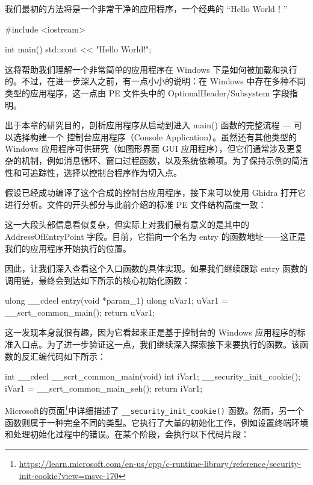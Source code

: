 
我们最初的方法将是一个非常干净的应用程序，一个经典的 “Hello World！”

\begin{cpp}
#include <iostream>

int main() {
  std::cout << "Hello World!\n";
}
\end{cpp}

这将帮助我们理解一个非常简单的应用程序在 Windows 下是如何被加载和执行的。不过，在进一步深入之前，有一点小小的说明：在 Windows 中存在多种不同类型的应用程序，这一点由 PE 文件头中的 OptionalHeader/Subsystem 字段指明。

出于本章的研究目的，剖析应用程序从启动到进入 main() 函数的完整流程 --- 可以选择构建一个 控制台应用程序（Console Application）。虽然还有其他类型的 Windows 应用程序可供研究（如图形界面 GUI 应用程序），但它们通常涉及更复杂的机制，例如消息循环、窗口过程函数，以及系统依赖项。为了保持示例的简洁性和可追踪性，选择以控制台程序作为切入点。

假设已经成功编译了这个合成的控制台应用程序，接下来可以使用 Ghidra 打开它进行分析。文件的开头部分与此前介绍的标准 PE 文件结构高度一致：


这一大段头部信息看似复杂，但实际上对我们最有意义的是其中的 AddressOfEntryPoint 字段。目前，它指向一个名为 entry 的函数地址——这正是我们的应用程序开始执行的位置。

因此，让我们深入查看这个入口函数的具体实现。如果我们继续跟踪 entry 函数的调用链，最终会到达如下所示的核心初始化函数：

\begin{cpp}
ulong __cdecl entry(void *param_1) {
  ulong uVar1;
  uVar1 = __scrt_common_main();
  return uVar1;
}
\end{cpp}

这一发现本身就很有趣，因为它看起来正是基于控制台的 Windows 应用程序的标准入口点。为了进一步验证这一点，我们继续深入探索接下来要执行的函数。该函数的反汇编代码如下所示：

\begin{cpp}
int __cdecl __scrt_common_main(void) {
  int iVar1;
  __security_init_cookie();
  iVar1 = __scrt_common_main_seh();
  return iVar1;
}
\end{cpp}

Microsoft的页面\footnote{\url{https://learn.microsoft.com/en-us/cpp/c-runtime-library/reference/security-init-cookie?view=msvc-170}}中详细描述了 \verb|__security_init_cookie()| 函数。然而，另一个函数则属于一种完全不同的类型。它执行了大量的初始化工作，例如设置终端环境和处理初始化过程中的错误。在某个阶段，会执行以下代码片段：

